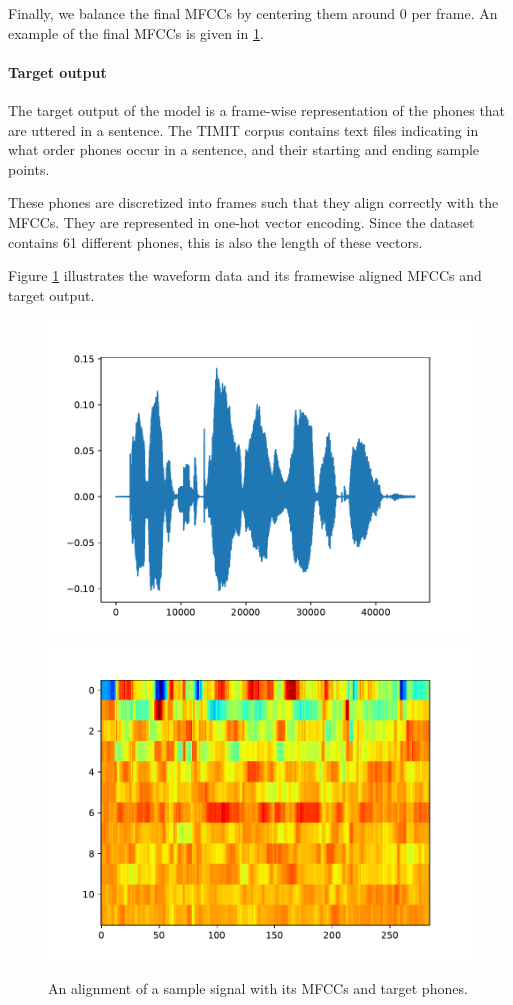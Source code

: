 			Finally, we balance the final MFCCs by centering them around 0 per frame.
			An example of the final MFCCs is given in \ref{fig:source_mfcc_target}.

		\paragraph{Target output}

			The target output of the model is a frame-wise representation of the phones that are uttered in a sentence.
			The TIMIT corpus contains text files indicating in what order phones occur in a sentence, and their starting and ending sample points.

			These phones are discretized into frames such that they align correctly with the MFCCs.
			They are represented in one-hot vector encoding.
			Since the dataset contains 61 different phones, this is also the length of these vectors.

			Figure \ref{fig:source_mfcc_target} illustrates the waveform data and its framewise aligned MFCCs and target output.




		\begin{figure}[ht]
		    \centering
		    \includegraphics[width=.45\linewidth]{gfx/signal}\\
		    \includegraphics[width=.45\linewidth]{gfx/mfcc}\\
		    \label{fig:source_mfcc_target}
		    \caption{An alignment of a sample signal with its MFCCs and target phones.}
		\end{figure}


